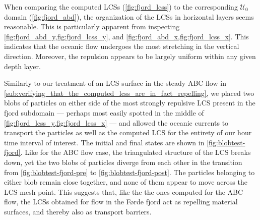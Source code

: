 



When comparing the computed LCSs (\cref{fig:fjord_lcss}) to the corresponding
$\mathcal{U}_{0}$ domain (\cref{fig:fjord_abd}), the organization of
the LCSs in horizontal layers seems reasonable. This is particularly apparent
from inspecting \cref{fig:fjord_abd_y,fig:fjord_lcss_y}, and
\cref{fig:fjord_abd_x,fig:fjord_lcss_x}. This indicates that the oceanic
flow undergoes the most stretching in the vertical direction. Moreover, the
repulsion appears to be largely uniform within any given depth layer.

Similarly to our treatment of an LCS surface in the steady ABC flow in
\cref{sub:verifying_that_the_computed_lcss_are_in_fact_repelling}, we placed
two blobs of particles on either side of the most strongly repulsive LCS
present in the fjord subdomain --- perhaps most easily spotted in the middle
of \cref{fig:fjord_lcss_y,fig:fjord_lcss_x} --- and allowed the oceanic
currents to transport the particles as well as the computed LCS for the
entirety of our  hour time interval of interest. The initial and
final states are shown in \cref{fig:blobtest-fjord}. Like for the ABC flow
case, the triangulated structure of the LCS breaks down, yet the two blobs of
particles diverge from each other in the transition from
\cref{fig:blobtest-fjord-pre} to \cref{fig:blobtest-fjord-post}. The particles
belonging to either blob remain close together, and none of them appear to
move across the LCS mesh point. This suggests that, like the the ones computed
for the ABC flow, the LCSs obtained for flow in the Førde fjord act as
repelling material surfaces, and thereby also as transport barriers.




